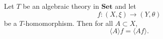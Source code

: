 Let $T$ be an algebraic theory in $\mathbf{Set}$ and let
$$f \colon (X, \xi) \longrightarrow (Y, \theta)$$
be a $T$-homomorphism. Then for all $A \subset X$,
$$\langle A \rangle f = \langle A f \rangle.$$
